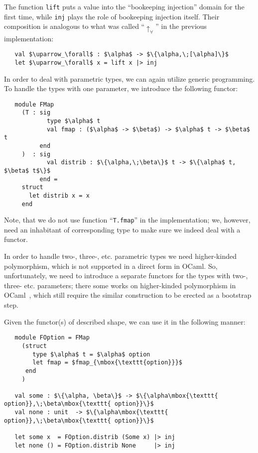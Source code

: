 The function \lstinline{lift} puts a value into the ``bookeeping injection'' domain for the first time, while
\lstinline{inj} plays the role of bookeeping injection itself. Their composition is analogous to what was 
called ``$\uparrow_\forall$'' in the previous implementation:

\begin{lstlisting}
   val $\uparrow_\forall$ : $\alpha$ -> $\{\alpha,\;[\alpha]\}$
   let $\uparrow_\forall$ x = lift x |> inj
\end{lstlisting}

In order to deal with parametric types, we can again utilize generic programming. To handle the types with
one parameter, we introduce the following functor:

\begin{lstlisting}
   module FMap 
     (T : sig 
            type $\alpha$ t 
            val fmap : ($\alpha$ -> $\beta$) -> $\alpha$ t -> $\beta$ t 
          end
     )  : sig
            val distrib : $\{\alpha,\;\beta\}$ t -> $\{\alpha$ t, $\beta$ t$\}$
          end =
     struct
       let distrib x = x
     end
\end{lstlisting}

Note, that we do not use function ``\lstinline{T.fmap}'' in the implementation; we, however, need an inhabitant of
corresponding type to make sure we indeed deal with a functor.

In order to handle two-, three-, etc. parametric types we need higher-kinded polymorphism, which is
not supported in a direct form in OCaml. So, unfortunately, we need to introduce a separate
functors for the types with two-, three- etc. parameters; there some works on higher-kinded
polymorphism in OCaml~\cite{HKinded}, which still require the similar construction to be
erected as a bootstrap step.

Given the functor(s) of described shape, we can use it in the following manner:

\begin{lstlisting}
   module FOption = FMap 
     (struct 
        type $\alpha$ t = $\alpha$ option 
        let fmap = $fmap_{\mbox{\texttt{option}}}$ 
      end
     )

   val some : $\{\alpha, \beta\}$ -> $\{\alpha\mbox{\texttt{ option}},\;\beta\mbox{\texttt{ option}}\}$
   val none : unit  -> $\{\alpha\mbox{\texttt{ option}},\;\beta\mbox{\texttt{ option}}\}$
   
   let some x  = FOption.distrib (Some x) |> inj
   let none () = FOption.distrib None     |> inj
\end{lstlisting}

